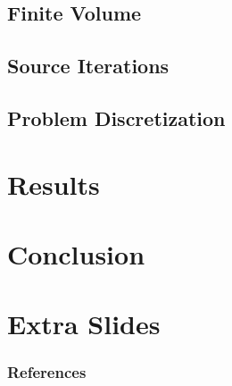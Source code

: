 \documentclass[9pt]{beamer}
\begin{document}
\subsection{Finite Volume}



\subsection{Source Iterations}


\subsection{Problem Discretization}


\section{Results}



\section{Conclusion}



\section{Extra Slides}


% 
\begin{frame}[allowframebreaks]
  \frametitle{References}
  
  {\footnotesize  }

\end{frame}

\end{document}
